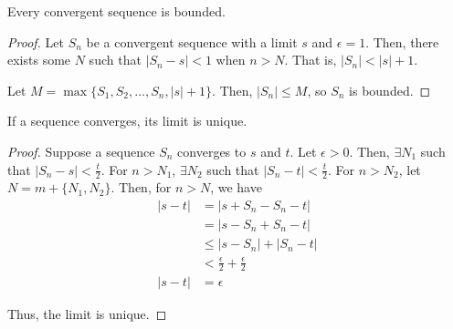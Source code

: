 \begin{theorem}{}{}
    Every convergent sequence is bounded.
\end{theorem}
\begin{proof}
    Let $S_n$ be a convergent sequence with a limit $s$ and $\epsilon = 1$. Then, there exists some $N$ such that $|S_n - s| < 1$ when $n > N$. That is, $|S_n| < |s| + 1$.

    Let $M = \max\{S_1, S_2, \ldots, S_n, |s| + 1\}$. Then, $|S_n| \leq M$, so $S_n$ is bounded.
\end{proof}

\begin{theorem}{}{}
    If a sequence converges, its limit is unique.
\end{theorem}
\begin{proof}
    Suppose a sequence $S_n$ converges to $s$ and $t$. Let $\epsilon > 0$. Then, $\exists N_1$ such that $|S_n - s| < \frac{t}{2}$. For $n > N_1$, $\exists N_2$ such that $|S_n - t| < \frac{t}{2}$. For $n > N_2$, let $N = m + \{N_1, N_2\}$. Then, for $n > N$, we have
    \begin{align*}
        |s - t| &= |s + S_n - S_n - t| \\
        &= |s - S_n + S_n - t| \\
        &\leq |s - S_n| + |S_n - t| \\
        &< \frac{\epsilon}{2} + \frac{\epsilon}{2} \\
        |s - t| &= \epsilon
    \end{align*}

    Thus, the limit is unique.
\end{proof}